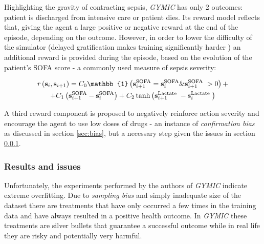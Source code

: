 Highlighting the gravity of contracting sepsis, \emph{GYMIC} has only 2 outcomes: patient is discharged from intensive care or patient dies.
Its reward model reflects that, giving the agent a large positive or negative reward at the end of the episode, depending on the outcome.
However, in order to lower the difficulty of the simulator (delayed gratification makes training significantly harder \cite{delayedgrat-humans,gulwaniProgramSynthesis2017}) an additional reward is provided during the episode, based on the evolution of the patient's SOFA score \cite{sofa} - a commonly used measure of sepsis severity:

\begin{multline}
\reward\left(\state_{\step}, \state_{\step+1}\right)=C_{0} \mathbb{1}\left(\state_{\step+1}^{\mathrm{SOFA}}=\state_{\step}^{\mathrm{SOFA}} \& \state_{\step+1}^{\text{SOFA }}>0\right) + \\ +
C_{1}\left(\state_{\step+1}^{\mathrm{SOFA}}-\state_{\step}^{\mathrm{SOFA}}\right) + 
C_{2} \tanh \left(\state_{\step+1}^{\text{Lactate }}-\state_{\step}^{\text{Lactate }}\right)
\end{multline}

A third reward component is proposed to negatively reinforce action severity and encourage the agent to use low doses of drugs - an instance of \emph{confirmation bias} as discussed in section \ref{sec:bias}, but a necessary step given the issues in section \ref{sec:gymic-results}.

\subsubsection{Results and issues}
\label{sec:gymic-results}

Unfortunately, the experiments performed by the authors of \emph{GYMIC} indicate extreme overfitting.
Due to \emph{sampling bias} and simply inadequate size of the dataset there are treatments that have only occurred a few times in the training data and have always resulted in a positive health outcome.
In \emph{GYMIC} these treatments are silver bullets that guarantee a successful outcome while in real life they are risky and potentially very harmful.
